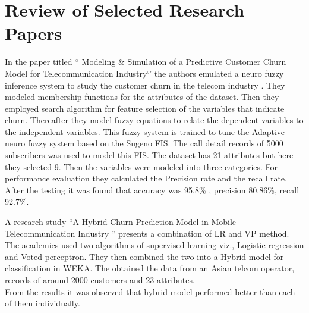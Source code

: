 \newpage
\section{Review of Selected Research Papers}

In the paper titled `` Modeling \& Simulation  of a Predictive Customer Churn Model for Telecommunication Industry‘’ the authors emulated a neuro fuzzy inference system to study the customer churn in the telecom industry . They modeled membership functions for the attributes of the dataset. Then they employed search algorithm for feature selection of the variables that indicate churn. Thereafter they model fuzzy equations to relate the dependent variables to the independent variables. This fuzzy system is trained to tune the Adaptive neuro fuzzy system based on the Sugeno FIS. The call detail records of 5000 subscribers was used to model this FIS. The dataset has 21 attributes but here they selected 9. Then the variables were modeled into three categories. For performance evaluation they calculated the Precision rate and the recall rate. After the testing it was found that accuracy was 95.8\% , precision 80.86\%, recall 92.7\%.

A research study ``A Hybrid Churn Prediction Model 
in
Mobile 
Telecommunication Industry ''  presents a combination of LR and VP method. The academics used two algorithms of supervised learning viz., Logistic regression and Voted perceptron. They then combined the two into a Hybrid model for classification in WEKA.
The obtained the data from an Asian telcom operator, records of around 2000 customers and 23 attributes.\\
From the results it was observed that hybrid model performed better than each of them individually.

